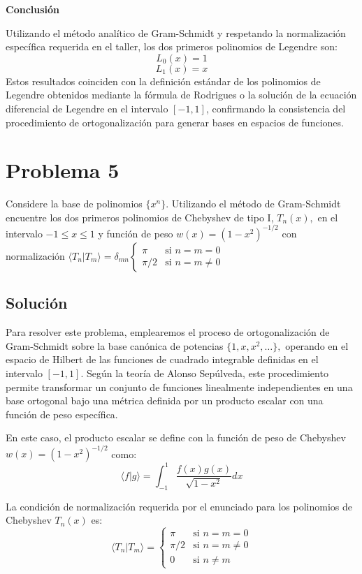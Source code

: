 \documentclass[a4paper]{article}
\begin{document}
\textbf{Conclusión}

Utilizando el método analítico de Gram-Schmidt y respetando la normalización específica requerida en el taller, los dos primeros polinomios de Legendre son:
$$ L_0(x) = 1 $$
$$ L_1(x) = x $$
Estos resultados coinciden con la definición estándar de los polinomios de Legendre obtenidos mediante la fórmula de Rodrigues o la solución de la ecuación diferencial de Legendre en el intervalo $[-1, 1]$, confirmando la consistencia del procedimiento de ortogonalización para generar bases en espacios de funciones.


\section{Problema 5}
Considere la base de polinomios $\{x^n\}.$ Utilizando el método de Gram-Schmidt encuentre los dos primeros polinomios de Chebyshev de tipo I, $T_n(x),$ en el intervalo $-1 \leq x \leq 1$ y función de peso $w(x) = (1-x^2)^{-1/2}$ con normalización $\langle T_n|T_m\rangle = \delta_{mn} \begin{cases} \pi & \text{si } n=m=0 \\ \pi/2 & \text{si } n=m \neq 0 \end{cases}$

\subsection{Solución}

Para resolver este problema, emplearemos el proceso de ortogonalización de Gram-Schmidt sobre la base canónica de potencias $\{1, x, x^2, \dots\},$ operando en el espacio de Hilbert de las funciones de cuadrado integrable definidas en el intervalo $[-1, 1].$ Según la teoría de Alonso Sepúlveda, este procedimiento permite transformar un conjunto de funciones linealmente independientes en una base ortogonal bajo una métrica definida por un producto escalar con una función de peso específica.

En este caso, el producto escalar se define con la función de peso de Chebyshev $w(x) = (1-x^2)^{-1/2}$ como:
$$ \langle f | g \rangle = \int_{-1}^{1} \frac{f(x)g(x)}{\sqrt{1-x^2}} dx $$

La condición de normalización requerida por el enunciado para los polinomios de Chebyshev $T_n(x)$ es:
$$ \langle T_n | T_m \rangle = \begin{cases} \pi & \text{si } n=m=0 \\ \pi/2 & \text{si } n=m \neq 0 \\ 0 & \text{si } n \neq m \end{cases} $$
\end{document}

